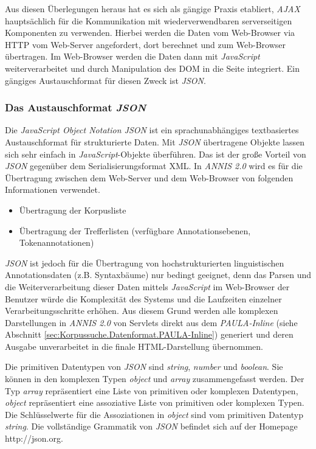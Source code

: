 Aus diesen Überlegungen heraus hat es sich als gängige Praxis etabliert, \emph{AJAX} hauptsächlich für die Kommunikation mit wiederverwendbaren serverseitigen Komponenten zu verwenden. Hierbei werden die Daten vom Web-Browser via HTTP vom Web-Server angefordert, dort berechnet und zum Web-Browser übertragen. Im Web-Browser werden die Daten dann mit \emph{JavaScript} weiterverarbeitet und durch Manipulation des DOM in die Seite integriert. Ein gängiges Austauschformat für diesen Zweck ist \emph{JSON}.

\subsubsection{Das Austauschformat \emph{JSON}}\label{sec:JSON}

Die \emph{JavaScript Object Notation JSON} ist ein sprachunabhängiges textbasiertes Austauschformat für strukturierte Daten. Mit \emph{JSON} übertragene Objekte lassen sich sehr einfach in \emph{JavaScript}-Objekte überführen. Das ist der große Vorteil von \emph{JSON} gegenüber dem Serialisierungsformat XML. In \emph{ANNIS 2.0} wird es für die Übertragung zwischen dem Web-Server und dem Web-Browser von folgenden Informationen verwendet.

\begin{itemize}
	\item{Übertragung der Korpusliste}
	\item{Übertragung der Trefferlisten (verfügbare Annotationsebenen, Tokenannotationen)}
\end{itemize}

\emph{JSON} ist jedoch für die Übertragung von hochstrukturierten linguistischen Annotationsdaten (z.B. Syntaxbäume) nur bedingt geeignet, denn das Parsen und die Weiterverarbeitung dieser Daten mittels \emph{JavaScript} im Web-Browser der Benutzer würde die Komplexität des Systems und die Laufzeiten einzelner Verarbeitungsschritte erhöhen. Aus diesem Grund werden alle komplexen Darstellungen in \emph{ANNIS 2.0} von Servlets direkt aus dem \emph{PAULA-Inline} (siehe Abschnitt \ref{sec:Korpussuche.Datenformat.PAULA-Inline}) generiert und deren Ausgabe unverarbeitet in die finale HTML-Darstellung übernommen.

Die primitiven Datentypen von \emph{JSON} sind \emph{string}, \emph{number} und \emph{boolean}. Sie können in den komplexen Typen \emph{object} und \emph{array} zusammengefasst werden. Der Typ \emph{array}  repräsentiert eine Liste von primitiven oder komplexen Datentypen, \emph{object} repräsentiert eine assoziative Liste von primitiven oder komplexen Typen. Die Schlüsselwerte für die Assoziationen in \emph{object} sind vom primitiven Datentyp \emph{string}. Die vollständige Grammatik von \emph{JSON} befindet sich auf der Homepage http://json.org. 

